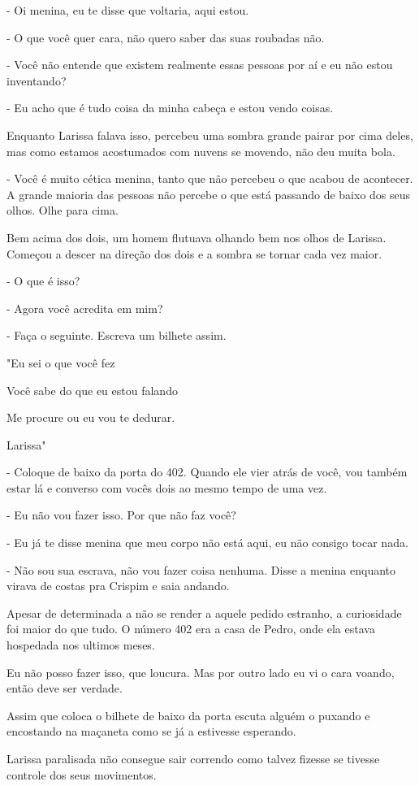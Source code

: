- Oi menina, eu te disse que voltaria, aqui estou.

- O que você quer cara, não quero saber das suas roubadas não.

- Você não entende que existem realmente essas pessoas por aí e eu não estou inventando?

- Eu acho que é tudo coisa da minha cabeça e estou vendo coisas.

Enquanto Larissa falava isso, percebeu uma sombra grande pairar por cima deles, mas como estamos acostumados com nuvens se movendo, não deu muita bola. 

- Você é muito cética menina, tanto que não percebeu o que acabou de acontecer. A grande maioria das pessoas não percebe o que está passando de baixo dos seus olhos. Olhe para cima.

Bem acima dos dois, um homem flutuava olhando bem nos olhos de Larissa. Começou a descer na direção dos dois e a sombra se tornar cada vez maior.

- O que é isso?

- Agora você acredita em mim?

- Faça o seguinte. Escreva um bilhete assim.

"Eu sei o que você fez

Você sabe do que eu estou falando

Me procure ou eu vou te dedurar.

Larissa"

- Coloque de baixo da porta do 402. Quando ele vier atrás de você, vou também estar lá e converso com vocês dois ao mesmo tempo de uma vez.

- Eu não vou fazer isso. Por que não faz você?

- Eu já te disse menina que meu corpo não está aqui, eu não consigo tocar nada.

- Não sou sua escrava, não vou fazer coisa nenhuma. Disse a menina enquanto virava de costas pra Crispim e saia andando.

Apesar de determinada a não se render a aquele pedido estranho, a curiosidade foi maior do que tudo. O número 402 era a casa de Pedro, onde ela estava hospedada nos ultimos meses.

Eu não posso fazer isso, que loucura. Mas por outro lado eu vi o cara voando, então deve ser verdade.

Assim que coloca o bilhete de baixo da porta escuta alguém o puxando e encostando na maçaneta como se já a estivesse esperando.

Larissa paralisada não consegue sair correndo como talvez fizesse se tivesse controle dos seus movimentos.